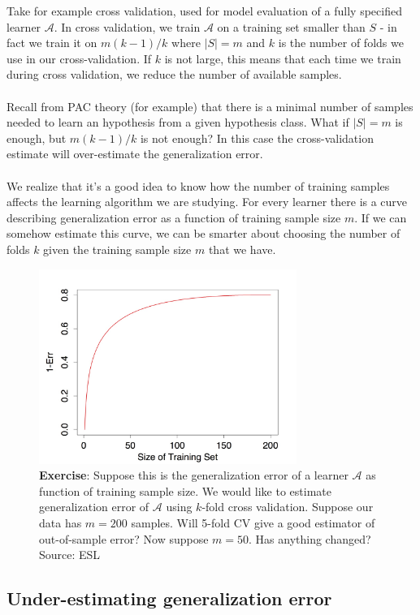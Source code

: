 \documentclass[11pt]{article}
\newcommand{\Ac}{\mathcal{A}}
\begin{document}
Take for example cross validation, used for model evaluation of a fully
specified learner $\Ac$. In cross validation, we train $\Ac$ on a training set
smaller than $S$ - in fact we train it on $m(k-1)/k$ where $|S|=m$ and $k$ is
the number of folds we use in our cross-validation. If $k$ is not large, this
means that each time we train during cross validation, we reduce the number of
available samples. 
\\~\\
Recall from PAC theory (for example) that there is a minimal number of samples
needed to learn an hypothesis from a given hypothesis class. What if $|S|=m$ is
enough, but $m(k-1)/k$ is not enough? In this case the cross-validation estimate
will over-estimate the generalization error. 
\\~\\
We realize that it's a good idea to know how the number of training samples
affects the learning algorithm we are studying. For every learner there is
a curve describing generalization error as a function of training sample size
$m$. If we can somehow estimate this curve, we can be smarter about choosing the
number of folds $k$ given the training sample size $m$ that we have.
      
\begin{figure}[H]
  \centering
  \includegraphics[width=3.3in]{learning_curve.jpeg}  
  \caption{{\bf Exercise}: Suppose this is the generalization error of a learner
    $\Ac$ as function of training sample size. We would like to estimate
    generalization error of $\Ac$ using $k$-fold cross validation. 
    Suppose our data has $m=200$ samples.  Will 5-fold CV give a good estimator
of out-of-sample error? Now
suppose $m=50$. Has anything changed? Source: ESL }
\end{figure}



\subsection{Under-estimating generalization error}
\end{document}
